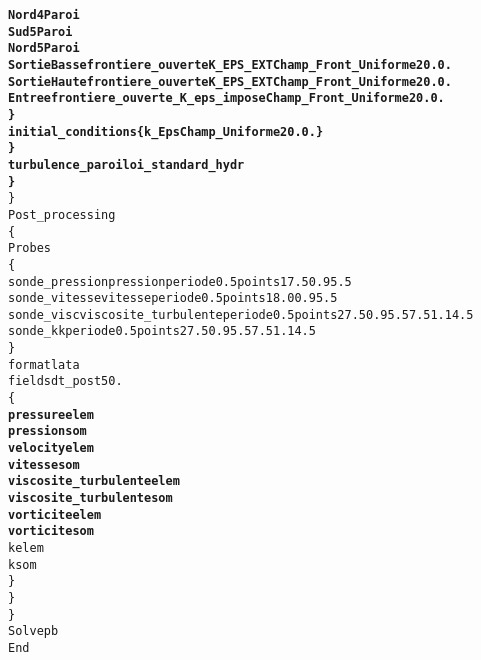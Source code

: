 \begin{alltt}
                     {\bf{Nord4 Paroi  }}
                     {\bf{Sud5 Paroi  }}
                     {\bf{Nord5 Paroi  }}
                     {\bf{SortieBasse frontiere_ouverte K_EPS_EXT Champ_Front_Uniforme 2 0. 0.  }}
                     {\bf{SortieHaute frontiere_ouverte K_EPS_EXT Champ_Front_Uniforme 2 0. 0.  }}
                     {\bf{Entree frontiere_ouverte_K_eps_impose Champ_Front_Uniforme 2 0. 0.  }}
                {\bf{\} }}
                {\bf{initial_conditions \{     k_Eps Champ_Uniforme 2 0. 0. \}  }}
            {\bf{\} }}
            {\bf{turbulence_paroi loi_standard_hydr  }}
        {\bf{\} }}
    \}
    Post_processing
    \{
        Probes 
        \{
            sonde_pression pression periode 0.5 points 1 7.5 0.9 5.5
            sonde_vitesse vitesse periode 0.5 points 1 8.0 0.9 5.5
            sonde_visc viscosite_turbulente periode 0.5 points 2 7.5 0.9 5.5 7.5 1.1 4.5
            sonde_k k periode 0.5 points 2 7.5 0.9 5.5 7.5 1.1 4.5
        \}
        format lata
        fields dt_post 50.
        \{
            {\bf{pressure elem}}
            {\bf{pression som}}
            {\bf{velocity elem}}
            {\bf{vitesse som}}
            {\bf{viscosite_turbulente elem}}
            {\bf{viscosite_turbulente som}}
            {\bf{vorticite elem}}
            {\bf{vorticite som}}
            k elem
            k som
        \}
    \}
\}
Solve pb
End
\end{alltt}
